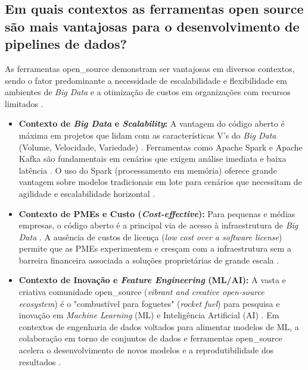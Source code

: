 \subsection{Em quais contextos as ferramentas open source são mais vantajosas para o desenvolvimento de pipelines de dados?}
\label{sec:respostas:contextos}

As ferramentas \acs{open_source} demonstram ser vantajosas em diversos contextos, sendo o fator predominante a necessidade de escalabilidade e flexibilidade em ambientes de \textit{Big Data} e a otimização de custos em organizações com recursos limitados \cite[]{septian2019, murarka2024}.

\begin{itemize}
    \item \textbf{Contexto de \textit{Big Data} e \textit{Scalability}:}
    A vantagem do código aberto é máxima em projetos que lidam com as características V's do \textit{Big Data} (Volume, Velocidade, Variedade) \cite[]{septian2019}. Ferramentas como Apache Spark e Apache Kafka são fundamentais em cenários que exigem análise imediata e baixa latência \cite[]{murarka2024}. O uso do Spark (processamento em memória) oferece grande vantagem sobre modelos tradicionais em lote para cenários que necessitam de agilidade e escalabilidade horizontal \cite[]{murarka2024}.

    \item \textbf{Contexto de PMEs e Custo (\textit{Cost-effective}):}
    Para pequenas e médias empresas, o código aberto é a principal via de acesso à infraestrutura de \textit{Big Data} \cite[]{septian2019}. A ausência de custos de licença (\textit{low cost over a software license}) permite que as PMEs experimentem e cresçam com a infraestrutura sem a barreira financeira associada a soluções proprietárias de grande escala \cite[]{septian2019}.

    \item \textbf{Contexto de Inovação e \textit{Feature Engineering} (ML/AI):}
    A vasta e criativa comunidade \acs{open_source} (\textit{vibrant and creative open-source ecosystem}) é o "combustível para foguetes" (\textit{rocket fuel}) para pesquisa e inovação em \textit{Machine Learning} (ML) e Inteligência Artificial (AI) \cite[]{reddi2021data}. Em contextos de engenharia de dados voltados para alimentar modelos de ML, a colaboração em torno de conjuntos de dados e ferramentas \acs{open_source} acelera o desenvolvimento de novos modelos e a reprodutibilidade dos resultados \cite[]{reddi2021data}.
\end{itemize}

